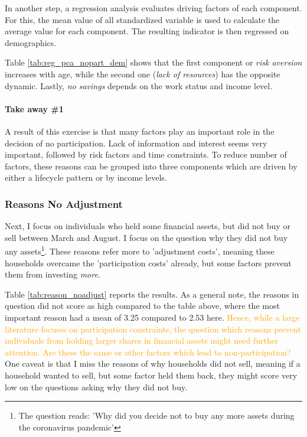 \documentclass[ProjectABM]{subfiles}
\begin{document}


In another step, a regression analysis evaluates driving factors of each component. For this, the mean value of all standardized variable is used to calculate the average value for each component. The resulting indicator is then regressed on demographics.

Table \ref{tab:reg_pca_nopart_dem} shows that the first component or \textit{risk aversion} increases with age, while the second one (\textit{lack of resources}) has the opposite dynamic. Lastly, \textit{no savings} depends on the work status and income level. 



\paragraph{Take away \#1}
A result of this exercise is that many factors play an important role in the decision of no participation. Lack of information and interest seems very important, followed by risk factors and time constraints. To reduce number of factors, these reasons can be grouped into three components which are driven by either a lifecycle pattern or by income levels. %

\subsubsection{Reasons No Adjustment}
Next, I focus on individuals who held some financial assets, but did not buy or sell between March and August. I focus on the question why they did not buy any assets\footnote{The question reads: 'Why did you decide not to buy any more assets during the coronavirus pandemic'}. These reasons refer more to 'adjustment costs', meaning these households overcame the 'participation costs' already, but some factors prevent them from investing \textit{more}.%



Table \ref{tab:reason_noadjust} reports the results. As a general note, the reasons in question did not score as high compared to the table above, where the most important reason had a mean of 3.25 compared to 2.53 here. \textcolor{orange}{Hence, while a large literature focuses on participation constraints, the question which reasons prevent individuals from holding larger shares in financial assets might need further attention. Are these the same or other factors which lead to non-participation?} One caveat is that I miss the reasons of why households did not sell, meaning if a household wanted to sell, but some factor held them back, they might score very low on the questions asking why they did not buy.
\end{document}
